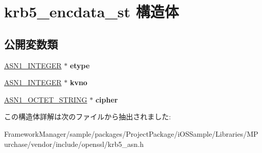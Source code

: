 \hypertarget{structkrb5__encdata__st}{}\section{krb5\+\_\+encdata\+\_\+st 構造体}
\label{structkrb5__encdata__st}
\subsection*{公開変数類}
\begin{DoxyCompactItemize}
\item 
\hypertarget{structkrb5__encdata__st_aa930746062320a82be3d81e363dd4ebf}{}\hyperlink{structasn1__string__st}{A\+S\+N1\+\_\+\+I\+N\+T\+E\+G\+E\+R} $\ast$ {\bfseries etype}\label{structkrb5__encdata__st_aa930746062320a82be3d81e363dd4ebf}

\item 
\hypertarget{structkrb5__encdata__st_a30352f26d2741ac03df07c308f0bbb66}{}\hyperlink{structasn1__string__st}{A\+S\+N1\+\_\+\+I\+N\+T\+E\+G\+E\+R} $\ast$ {\bfseries kvno}\label{structkrb5__encdata__st_a30352f26d2741ac03df07c308f0bbb66}

\item 
\hypertarget{structkrb5__encdata__st_a55de40ea971f2f93c618ea49322cbe0c}{}\hyperlink{structasn1__string__st}{A\+S\+N1\+\_\+\+O\+C\+T\+E\+T\+\_\+\+S\+T\+R\+I\+N\+G} $\ast$ {\bfseries cipher}\label{structkrb5__encdata__st_a55de40ea971f2f93c618ea49322cbe0c}

\end{DoxyCompactItemize}


この構造体詳解は次のファイルから抽出されました\+:\begin{DoxyCompactItemize}
\item 
Framework\+Manager/sample/packages/\+Project\+Package/i\+O\+S\+Sample/\+Libraries/\+M\+Purchase/vendor/include/openssl/krb5\+\_\+asn.\+h\end{DoxyCompactItemize}
